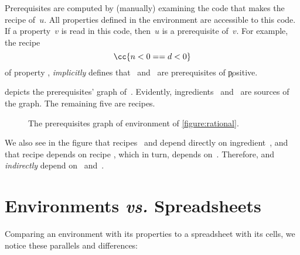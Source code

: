 Prerequisites are computed by (manually) examining the \Java code that makes
the recipe of~$u$. All properties defined in the environment are accessible to
this \Java code. If a property~$v$ is read in this code, then~$u$ is a
prerequisite of~$v$.  For example, the recipe \[
  \cc{n < 0 == d < 0}
\] of property , \emph{implicitly} defines that~ and~
are prerequisites of \c{positive}.

 depicts the prerequisites' graph
of~. Evidently, ingredients~ and~ are sources of the
graph. The remaining five are recipes.

\begin{figure}[!hb]
  \centering
  \caption{\label{figure:rational:prerequisites}%
    The prerequisites graph of \Reap environment  of
    \cref{figure:rational}.
  }%
  \begin{adjustbox}{width=4in}
      
  \end{adjustbox}
\end{figure}

We also see in the figure that recipes~ and  depend directly
on ingredient~, and that recipe  depends on recipe ,
which in turn, depends on~. Therefore,  and 
\emph{indirectly} depend on~ and~.

\section{Environments \emph{vs.} Spreadsheets}
Comparing an environment with its properties to a spreadsheet with its cells,
we notice these parallels and differences:

